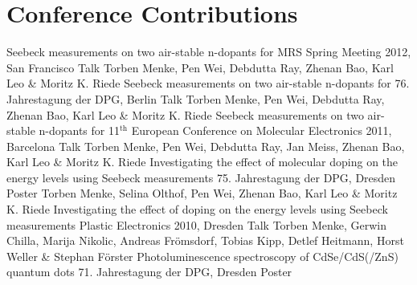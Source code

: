 \section*{Conference Contributions}
\begin{enumerate}
{Seebeck measurements on two air-stable n-dopants for \CS{}}
{MRS Spring Meeting 2012, San Francisco}
{Talk}
%
\myConf
{Torben Menke, Pen Wei, Debdutta Ray, Zhenan Bao, Karl Leo \& Moritz K. Riede}
{Seebeck measurements on two air-stable n-dopants for \CS{}}
{76. Jahrestagung der DPG, Berlin}
{Talk}
%
\myConf
{Torben Menke, Pen Wei, Debdutta Ray, Zhenan Bao, Karl Leo \& Moritz K. Riede}
{Seebeck measurements on two air-stable n-dopants for \CS{}}
{11$^\text{th}$ European Conference on Molecular Electronics 2011, Barcelona}
{Talk}
%
\myConf
{Torben Menke, Pen Wei, Debdutta Ray, Jan Meiss, Zhenan Bao, Karl Leo \& Moritz K. Riede}
{Investigating the effect of molecular doping on the energy levels using Seebeck measurements}
{75. Jahrestagung der DPG, Dresden}
{Poster}
%
\myConf
{Torben Menke, Selina Olthof, Pen Wei, Zhenan Bao, Karl Leo \& Moritz K. Riede}
{Investigating the effect of doping on the energy levels using Seebeck measurements}
{Plastic Electronics 2010, Dresden}
{Talk}
%
\myConf
{Torben Menke, Gerwin Chilla, Marija Nikolic, Andreas Frömsdorf, Tobias Kipp, Detlef Heitmann, Horst Weller \& Stephan Förster}
{Photoluminescence spectroscopy of CdSe/CdS(/ZnS) quantum dots}
{71. Jahrestagung der DPG, Dresden}
{Poster}
\end{enumerate}

